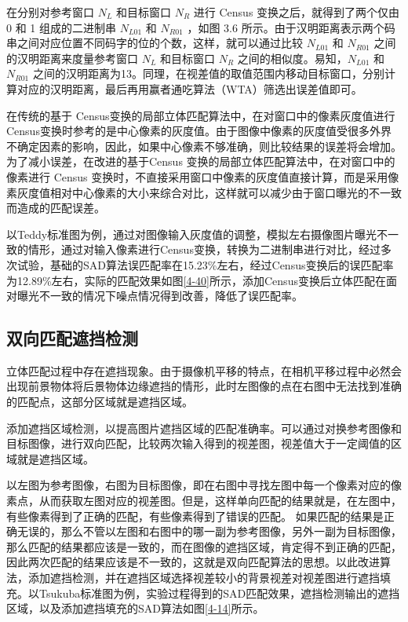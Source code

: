 在分别对参考窗口 $N_{L}$ 和目标窗口 $N_{R}$ 进行 Census 变换之后，就得到了两个仅由 0 和 1 组成的二进制串 $N_{L01}$ 和 $N_{R01}$ ，如图 3.6 所示。由于汉明距离表示两个码串之间对应位置不同码字的位的个数，这样，就可以通过比较 $N_{L01}$ 和 $N_{R01}$ 之间的汉明距离来度量参考窗口 $N_{L}$ 和目标窗口 $N_{R}$ 之间的相似度。易知，$N_{L01}$ 和 $N_{R01}$ 之间的汉明距离为13。同理，在视差值的取值范围内移动目标窗口，分别计算对应的汉明距离，最后再用赢者通吃算法（WTA）筛选出误差值即可。

在传统的基于 Census变换的局部立体匹配算法中，在对窗口中的像素灰度值进行 Census变换时参考的是中心像素的灰度值。由于图像中像素的灰度值受很多外界不确定因素的影响，因此，如果中心像素不够准确，则比较结果的误差将会增加。为了减小误差，在改进的基于Census 变换的局部立体匹配算法中，在对窗口中的像素进行 Census 变换时，不直接采用窗口中像素的灰度值直接计算，而是采用像素灰度值相对中心像素的大小来综合对比，这样就可以减少由于窗口曝光的不一致而造成的匹配误差。

以Teddy标准图为例，通过对图像输入灰度值的调整，模拟左右摄像图片曝光不一致的情形，通过对输入像素进行Census变换，转换为二进制串进行对比，经过多次试验，基础的SAD算法误匹配率在15.23\%左右，经过Census变换后的误匹配率为12.89\%左右，实际的匹配效果如图\ref{4-40}所示，添加Census变换后立体匹配在面对曝光不一致的情况下噪点情况得到改善，降低了误匹配率。

\subsection{双向匹配遮挡检测}

立体匹配过程中存在遮挡现象。由于摄像机平移的特点，在相机平移过程中必然会出现前景物体将后景物体边缘遮挡的情形，此时左图像的点在右图中无法找到准确的匹配点，这部分区域就是遮挡区域。

添加遮挡区域检测，以提高图片遮挡区域的匹配准确率。可以通过对换参考图像和目标图像，进行双向匹配，比较两次输入得到的视差图，视差值大于一定阈值的区域就是遮挡区域。


以左图为参考图像，右图为目标图像，即在右图中寻找左图中每一个像素对应的像素点，从而获取左图对应的视差图。但是，这样单向匹配的结果就是，在左图中，有些像素得到了正确的匹配，有些像素得到了错误的匹配。 如果匹配的结果是正确无误的，那么不管以左图和右图中的哪一副为参考图像，另外一副为目标图像，那么匹配的结果都应该是一致的，而在图像的遮挡区域，肯定得不到正确的匹配，因此两次匹配的结果应该是不一致的，这就是双向匹配算法的思想。以此改进算法，添加遮挡检测，并在遮挡区域选择视差较小的背景视差对视差图进行遮挡填充。以Tsukuba标准图为例，实验过程得到的SAD匹配效果，遮挡检测输出的遮挡区域，以及添加遮挡填充的SAD算法如图\ref{4-14}所示。

